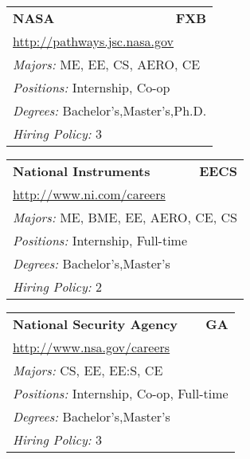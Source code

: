 \documentclass[twoside]{article}
\begin{document}
\begin{center}
\begin{multicols}{3}
\begin{FlushLeft}
\begin{minipage}{.9\columnwidth}\begin{tabularx}{.95\columnwidth}{Xr}
                 {\Large\bf NASA} & {\Large\bf FXB}\\
    \multicolumn{2}{p{.95\columnwidth}}{\url{http://pathways.jsc.nasa.gov}}\\
    \multicolumn{2}{p{.95\columnwidth}}{\emph{Majors:} ME, EE, CS, AERO, CE}\\
    \multicolumn{2}{p{.95\columnwidth}}{\emph{Positions:} Internship, Co-op}\\
    \multicolumn{2}{p{.95\columnwidth}}{\emph{Degrees:} Bachelor's,Master's,Ph.D.}\\
    \multicolumn{2}{p{.95\columnwidth}}{\emph{Hiring Policy:} 3}\\
    \end{tabularx}
    
\end{minipage}
 
\begin{minipage}{.9\columnwidth}\begin{tabularx}{.95\columnwidth}{Xr}
                 {\Large\bf National Instruments} & {\Large\bf EECS}\\
    \multicolumn{2}{p{.95\columnwidth}}{\url{http://www.ni.com/careers}}\\
    \multicolumn{2}{p{.95\columnwidth}}{\emph{Majors:} ME, BME, EE, AERO, CE, CS}\\
    \multicolumn{2}{p{.95\columnwidth}}{\emph{Positions:} Internship, Full-time}\\
    \multicolumn{2}{p{.95\columnwidth}}{\emph{Degrees:} Bachelor's,Master's}\\
    \multicolumn{2}{p{.95\columnwidth}}{\emph{Hiring Policy:} 2}\\
    \end{tabularx}
    
\end{minipage}
 
\begin{minipage}{.9\columnwidth}\begin{tabularx}{.95\columnwidth}{Xr}
                 {\Large\bf National Security Agency} & {\Large\bf GA}\\
    \multicolumn{2}{p{.95\columnwidth}}{\url{http://www.nsa.gov/careers}}\\
    \multicolumn{2}{p{.95\columnwidth}}{\emph{Majors:} CS, EE, EE:S, CE}\\
    \multicolumn{2}{p{.95\columnwidth}}{\emph{Positions:} Internship, Co-op, Full-time}\\
    \multicolumn{2}{p{.95\columnwidth}}{\emph{Degrees:} Bachelor's,Master's}\\
    \multicolumn{2}{p{.95\columnwidth}}{\emph{Hiring Policy:} 3}\\
    \end{tabularx}
    

\end{minipage}
\end{FlushLeft}
\end{multicols}
\end{center}
\end{document}
